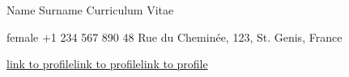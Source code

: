 \documentclass{template}
\begin{document}

{Name Surname}
{Curriculum Vitae}


\hspace{1.5cm}
\begin{minipage}{0.6\textwidth}
    {female}
    {+1 234 567 890 }
    {48 Rue du Cheminée, 123, St. Genis, France}
\end{minipage}
\hspace{-2cm}
\begin{minipage}{0.5\textwidth}
    {\href{https://github.com/example}{link to profile}}{\href{https://www.linkedin.com/in/example/}{link to profile}}{\href{https://www.researchgate.net/profile/example}{link to profile}}
\end{minipage}




\end{document}

